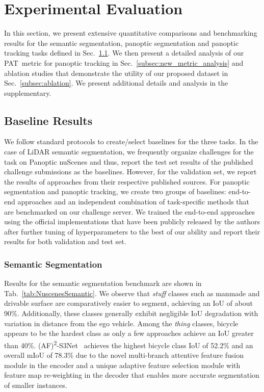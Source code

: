 \documentclass[letterpaper, 10 pt, journal, twoside]{IEEEtran}
\newcommand{\secref}[1]{Sec.~\ref{#1}}
\newcommand{\tabref}[1]{Tab.~\ref{#1}}
\newcommand{\newmet}{PAT}
\begin{document}
%
 
\section{Experimental Evaluation}
\label{sec:experiments}

In this section, we present extensive quantitative comparisons and benchmarking results for the semantic segmentation, panoptic segmentation and panoptic tracking tasks defined in \secref{subsec:baseline_results}. We then present a detailed analysis of our \newmet~metric for panoptic tracking in \secref{subsec:new_metric_analysis} and ablation studies that demonstrate the utility of our proposed dataset in \secref{subsec:ablation}. We present additional details and analysis in the supplementary. 

\subsection{Baseline Results}
\label{subsec:baseline_results}

We follow standard protocols to create/select baselines for the three tasks. In the case of LiDAR semantic segmentation, we frequently organize challenges for the task on Panoptic nuScenes and thus, report the test set results of the published challenge submissions as the baselines. However, for the validation set, we report the results of approaches from their respective published sources. For panoptic segmentation and panoptic tracking, we create two groups of baselines: end-to-end approaches and an independent combination of task-specific methods that are benchmarked on our challenge server. We trained the end-to-end approaches using the official implementations that have been publicly released by the authors after further tuning of hyperparameters to the best of our ability and report their results for both validation and test set.

\subsubsection{Semantic Segmentation}

Results for the semantic segmentation benchmark are shown in \tabref{tab:NuscenesSemantic}. We observe that \emph{stuff} classes such as manmade and drivable surface are comparatively easier to segment, achieving an IoU of about 90\%. Additionally, these classes generally exhibit negligible IoU degradation with variation in distance from the ego vehicle. Among the \emph{thing} classes, bicycle appears to be the hardest class as only a few approaches achieve an IoU greater than 40\%. (AF)\textsuperscript{2}-S3Net~\cite{cheng20212} achieves the highest bicycle class IoU of 52.2\% and an overall mIoU of 78.3\% due to the novel multi-branch attentive feature fusion module in the encoder and a unique adaptive feature selection module with feature map re-weighting in the decoder that enables more accurate segmentation of smaller instances.
\end{document}
